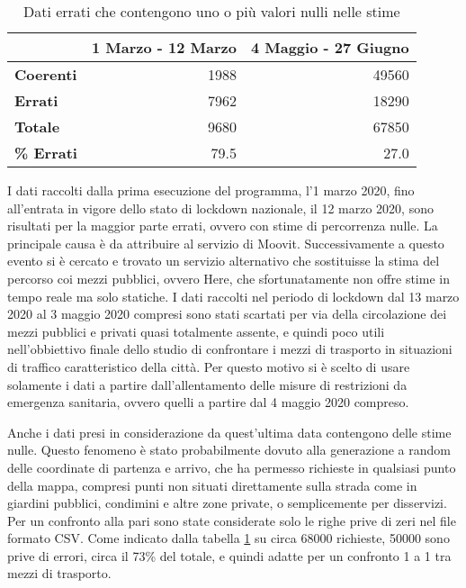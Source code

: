 \begin{table}[H]
\centering
\begin{tabular}{ | l | r | r | }
\hline

& \textbf{1 Marzo - 12 Marzo} & \textbf{4 Maggio - 27 Giugno} \\
\hline

\textbf{Coerenti}& 1988 & 49560 \\  
\textbf{Errati} & 7962 & 18290 \\
\hline
\textbf{Totale} & 9680 & 67850 \\
\textbf{\% Errati} & 79.5 & 27.0 \\
\hline
\end{tabular}
\caption{Dati errati che contengono uno o più valori nulli nelle stime}
\label{table:1}
\end{table}

I dati raccolti dalla prima esecuzione del programma, l'1 marzo 2020, fino all'entrata in vigore dello stato di lockdown nazionale, il 12 marzo 2020, sono risultati per la maggior parte errati, ovvero con stime di percorrenza nulle. La principale causa è da attribuire al servizio di Moovit. Successivamente a questo evento si è cercato e trovato un servizio alternativo che sostituisse la stima del percorso coi mezzi pubblici, ovvero Here, che sfortunatamente non offre stime in tempo reale ma solo statiche. I dati raccolti nel periodo di lockdown dal 13 marzo 2020 al 3 maggio 2020 compresi sono stati scartati per via della circolazione dei mezzi pubblici e privati quasi totalmente assente, e quindi poco utili nell'obbiettivo finale dello studio di confrontare i mezzi di trasporto in situazioni di traffico caratteristico della città. Per questo motivo si è scelto di usare solamente i dati a partire dall'allentamento delle misure di restrizioni da emergenza sanitaria, ovvero quelli a partire dal 4 maggio 2020 compreso.

Anche i dati presi in considerazione da quest'ultima data contengono delle stime nulle. Questo fenomeno è stato probabilmente dovuto alla generazione a random delle coordinate di partenza e arrivo, che ha permesso richieste in qualsiasi punto della mappa, compresi punti non situati direttamente sulla strada come in giardini pubblici, condimini e altre zone private, o semplicemente per disservizi. Per un confronto alla pari sono state considerate solo le righe prive di zeri nel file formato CSV. Come indicato dalla tabella \ref{table:1} su circa 68000 richieste, 50000 sono prive di errori, circa il 73\% del totale, e quindi adatte per un confronto 1 a 1 tra mezzi di trasporto.

